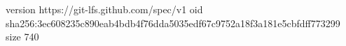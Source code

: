 version https://git-lfs.github.com/spec/v1
oid sha256:3ec608235c890eab4bdb4f76dda5035edf67c9752a18f3a181e5cbfdff773299
size 740
